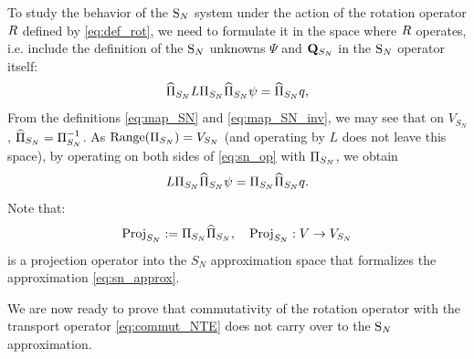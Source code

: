 To study the behavior of the $\SN$ system under the action of the rotation operator $\op{R}$
defined by \eqref{eq:def_rot}, we need to formulate it in the space where $\op{R}$ operates, i.e. include the definition
of the $\SN$ unknowns $\Psi$ and $\mat{Q}_{S_N}$ in the $\SN$ operator itself:
\begin{equation}\label{eq:sn_op}
	\PihSN \op{L}\PiSN \PihSN \psi = \PihSN q,
\end{equation}
From the definitions \eqref{eq:map_SN} and \eqref{eq:map_SN_inv}, we may see that on $V_{S_N}$, $\PihSN
 = \PiSN^{-1}$.
 As \mbox{$\Rng (\PiSN) = V_{S_N}$} (and operating by $L$ does not leave this space), by operating on both sides of
 \eqref{eq:sn_op} with $\PiSN$, we obtain
\begin{equation}\label{eq:sn_op2}
	\op{L}\PiSN \PihSN \psi = \PiSN\PihSN q.
\end{equation}
Note that:
\begin{equation}\label{eq:proj_sn}
	\Projop[S_N] := \PiSN \PihSN, \quad \Projop[S_N] : V \to V_{S_N}
\end{equation} 
is a projection operator into the $S_N$ approximation space that formalizes the approximation \eqref{eq:sn_approx}.

We are now ready to prove that commutativity of the rotation operator with the transport operator \eqref{eq:commut_NTE} 
does not carry over to the $\SN$ approximation. 

